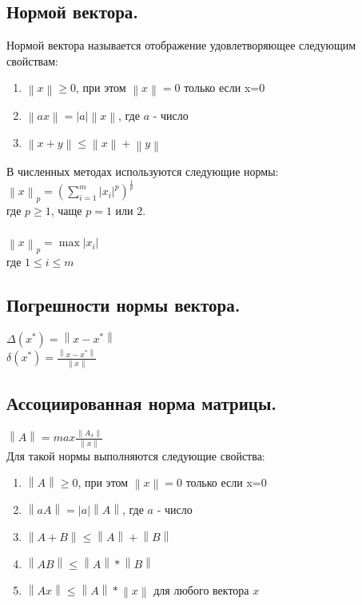 \documentclass[16pt]{article}
\begin{document}
            \subsection{Нормой вектора.}
            Нормой вектора называется отображение удовлетворяющее следующим свойствам:
            \begin{enumerate}
                \item{$\left\|x\right\| \geq 0$, при этом $\left\|x\right\| = 0$ только если x=0}
                \item{$\left\|ax\right\|=|a|\left\|x\right\|$, где $a$ - число}
                \item{$\left\|x+y\right\| \leq \left\|x\right\|+\left\|y\right\|$ }
            \end{enumerate}			
            В численных методах используются следующие нормы:\\
            $\left\|x\right\|_p = (\sum_{i = 1}^{m}|x_i|^p)^\frac{1}{p}$\\
            где $p \geq 1$, чаще $p = 1$ или $2$.\\ \\
            $\left\|x\right\|_p = \max|x_i|$\\
            где $1\leq i \leq m$
            \subsection{Погрешности нормы вектора.}
            $\Delta(x^{*}) = \left\|x-x^{*}\right\|$\\
            $\delta(x^{*}) = \frac{\left\|x-x^{*}\right\|}{\left\|x\right\|}$\\
            \subsection{Ассоциированная норма матрицы.}
            $\left\|A\right\| = max \frac{\left\|A_x\right\|}{\left\|x\right\|}$\\
            Для такой нормы выполняются следующие свойства:
            \begin{enumerate}    
                \item{$\left\|A\right\| \geq 0$, при этом $\left\|x\right\| = 0$ только если x=0}
                \item{$\left\|aA\right\|=|a|\left\|A\right\|$, где $a$ - число}
                \item{$\left\|A+B\right\| \leq \left\|A\right\|+\left\|B\right\|$ }
                \item{$\left\|AB\right\| \leq \left\|A\right\|*\left\|B\right\|$ }
                \item{$\left\|Ax\right\| \leq \left\|A\right\|*\left\|x\right\|$ для любого вектора $x$}
            \end{enumerate}    
\end{document}
